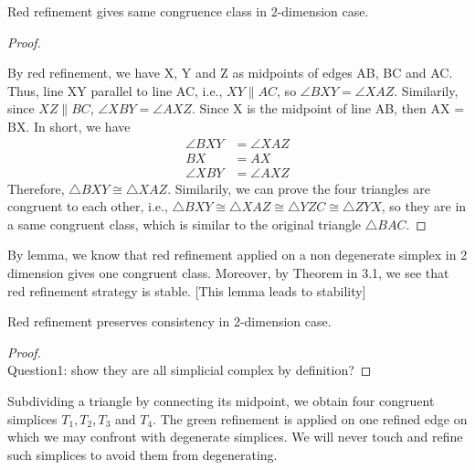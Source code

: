     \begin{lemma*}
    Red refinement gives same congruence class in 2-dimension case.
    \end{lemma*}
    \begin{proof}\mbox{}\\


    By red refinement, we have X, Y and Z as midpoints of edges AB, BC and AC. Thus, line XY parallel to line AC, i.e., $XY \parallel AC$, so $\angle{BXY} = \angle{XAZ}$. Similarily, since $XZ\parallel BC$, $\angle{XBY} = \angle{AXZ}$. Since X is the midpoint of line AB, then AX = BX. In short, we have 
    \begin{align*}
    \angle{BXY} &= \angle{XAZ}\\
    BX &= AX\\
    \angle{XBY} &= \angle{AXZ}
    \end{align*}
    Therefore, $\triangle{BXY} \cong \triangle{XAZ}$. Similarily, we can prove the four triangles are congruent to each other, i.e., $\triangle{BXY}\cong\triangle{XAZ}\cong\triangle{YZC} \cong\triangle{ZYX}$, so they are in a same congruent class, which is similar to the original triangle $\triangle{BAC}$.
    \end{proof}
    By lemma, we know that red refinement applied on a non degenerate simplex in 2 dimension gives one congruent class. Moreover, by Theorem in 3.1, we see that red refinement strategy is stable.
    [This lemma leads to stability]

    \begin{lemma*}
    Red refinement preserves consistency in 2-dimension case.
    \end{lemma*}
    \begin{proof}\mbox{}\\
    Question1: show they are all simplicial complex by definition?
    \end{proof}
    Subdividing a triangle by connecting its midpoint, we obtain four congruent simplices $T_1, T_2, T_3$ and $T_4$. The green refinement is applied on one refined edge on which we may confront with degenerate simplices. We will never touch and refine such simplices to avoid them from degenerating.

